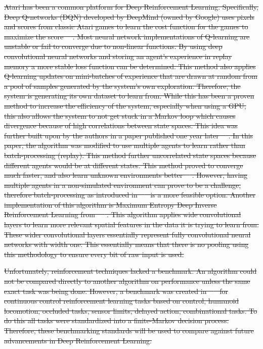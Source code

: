 \documentclass[12pt,american]{report}
\providecommand{\DIFdeltex}[1]{{\protect\color{red}\sout{#1}}}                      %
\providecommand{\DIFdel}[1]{\texorpdfstring{\DIFdeltex{#1}}{}} %
\begin{document}
\DIFdel{Atari has been a common platform for Deep Reinforcement Learning. Specifically, Deep Q-networks (DQN) developed by DeepMind (owned by Google) uses pixels and scores from classic Atari games to learn the cost function for the games to maximize the score~\mbox{%
\cite{mnih2015human}}%
. Most neural network implementations of Q-learning are unstable or fail to converge due to non-linear functions. By using deep convolutional neural networks and storing an agent's experience in replay memory a more stable loss function can be determined.   This method also applies Q-learning updates on mini-batches of experience that are drawn at random from a pool of samples generated by the system's own exploration. Therefore, the system is generating its own dataset to learn from. While this has been a proven method to increase the efficiency of the system, especially when using a GPU, this also allows the system to not get stuck in a Markov loop which causes divergence because of high correlations between state spaces.  This idea was further built upon by the authors in a paper published one year later~\mbox{%
\cite{mnih2016asynchronous}}%
. In this paper, the algorithm was modified to use multiple agents to learn rather than batch-processing (replay). This method further uncorrelated state spaces because different agents would be at different states. This method proved to converge much faster, and also learn unknown environments better~\mbox{%
\cite{mnih2016asynchronous}}%
. However, having multiple agents in a non-simulated environment can prove to be a challenge, therefore batch-processing as introduced in~\mbox{%
\cite{mnih2015human} }%
is a more feasible option. Another implementation of this algorithm is Maximum Entropy Deep Inverse Reinforcement Learning from ~\mbox{%
\cite{wulfmeier2015maximum}}%
. This algorithm applies wide convolutional layers to learn more relevant spatial features in the data it is trying to learn from. These wider convolutional layers essentially represent fully convolutional neural networks with width one. This essentially means that there is no pooling using this methodology to ensure every bit of raw input is used. 
	}%

\DIFdel{Unfortunately, reinforcement techniques lacked a benchmark.  An algorithm could not be compared directly to another algorithm on performance unless the same exact task was being done.  However, a benchmark was created in~\mbox{%
\cite{duan2016benchmarking} }%
for continuous control reinforcement learning tasks based on control, humanoid locomotion, occluded tasks, sensor limits, delayed action, combinational tasks. To do this all tasks were standardized into a finite-Markov decision process. Therefore, these benchmarking standards will be used to compare against future advancements in Deep Reinforcement Learning. 
}%
\end{document}
